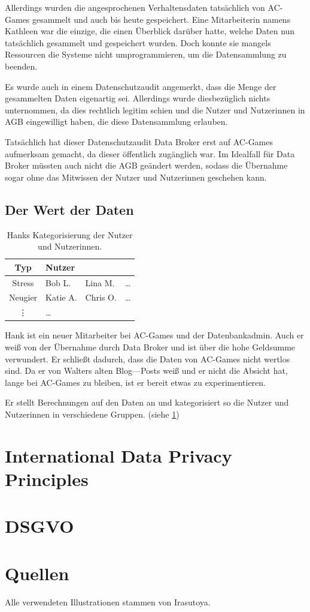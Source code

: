 \documentclass[11pt, a4paper]{scrartcl}
\begin{document}
Allerdings wurden die angesprochenen Verhaltensdaten tatsächlich von AC-Games gesammelt und auch bis heute gespeichert.
Eine Mitarbeiterin namens Kathleen war die einzige, die einen Überblick darüber hatte, welche Daten nun tatsächlich gesammelt und gespeichert wurden.
Doch konnte sie mangels Ressourcen die Systeme nicht umprogrammieren, um die Datensammlung zu beenden.

Es wurde auch in einem Datenschutzaudit angemerkt, dass die Menge der gesammelten Daten eigenartig sei.
Allerdings wurde diesbezüglich nichts unternommen, da dies rechtlich legitim schien
und die Nutzer und Nutzerinnen in AGB eingewilligt haben, die diese Datensammlung erlauben.

Tatsächlich hat dieser Datenschutzaudit Data Broker erst auf AC-Games aufmerksam gemacht, da dieser öffentlich zugänglich war.
Im Idealfall für Data Broker müssten auch nicht die AGB geändert werden, 
sodass die Übernahme sogar ohne das Mitwissen der Nutzer und Nutzerinnen geschehen kann. 

\subsection{Der Wert der Daten}

\begin{table}
   \begin{tabular}{c|lll} 
        \textbf{Typ} & \textbf{Nutzer} \\\hline
        Stress & Bob L. & Lina M. & \dots \\\hline
        Neugier & Katie A. & Chris O. & \dots \\ \vdots & \dots & & 
    \end{tabular} 
    \caption{Hanks Kategorisierung der Nutzer und Nutzerinnen.}
    \label{tab:03:categories}
\end{table}

Hank ist ein neuer Mitarbeiter bei AC-Games und der Datenbankadmin.
Auch er weiß von der Übernahme durch Data Broker und ist über die hohe Geldsumme verwundert.
Er schließt dadurch, dass die Daten von AC-Games nicht wertlos sind.
Da er von Walters alten Blog—Posts weiß und er nicht die Absicht hat, lange bei AC-Games zu bleiben,
ist er bereit etwas zu experimentieren.

Er stellt Berechnungen auf den Daten an und kategorisiert so die Nutzer und Nutzerinnen in verschiedene Gruppen. (siehe \cref{tab:03:categories})




\section{International Data Privacy Principles}

\section{DSGVO}

\newpage

\section{Quellen}

Alle verwendeten Illustrationen stammen von Irasutoya.\cite{mifune_irasutoya_nodate} 

\nocite{mifune_irasutoya_nodate}

\printbibliography[heading=none]
\end{document}
